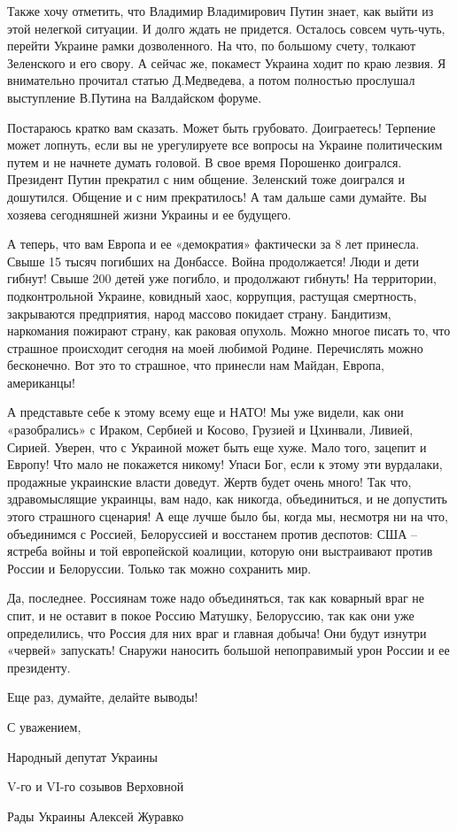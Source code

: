 Также хочу отметить, что Владимир Владимирович Путин знает, как выйти из этой
нелегкой ситуации. И долго ждать не придется. Осталось совсем чуть-чуть,
перейти Украине рамки дозволенного. На что, по большому счету, толкают
Зеленского и его свору. А сейчас же, покамест Украина ходит по краю лезвия. Я
внимательно прочитал статью Д.Медведева, а потом полностью прослушал
выступление В.Путина на Валдайском форуме.

Постараюсь кратко вам сказать. Может быть грубовато. Доиграетесь! Терпение
может лопнуть, если вы не урегулируете все вопросы на Украине политическим
путем и не начнете думать головой. В свое время Порошенко доигрался. Президент
Путин прекратил с ним общение. Зеленский тоже доигрался и дошутился. Общение и
с ним прекратилось! А там дальше сами думайте. Вы хозяева сегодняшней жизни
Украины и ее будущего.

А теперь, что вам Европа и ее «демократия» фактически за 8 лет принесла. Свыше
15 тысяч погибших на Донбассе. Война продолжается! Люди и дети гибнут! Свыше
200 детей уже погибло, и продолжают гибнуть! На территории, подконтрольной
Украине, ковидный хаос, коррупция, растущая смертность, закрываются
предприятия, народ массово покидает страну. Бандитизм, наркомания пожирают
страну, как раковая опухоль. Можно многое писать то, что страшное происходит
сегодня на моей любимой Родине. Перечислять можно бесконечно. Вот это то
страшное, что принесли нам Майдан, Европа, американцы!

А представьте себе к этому всему еще и НАТО! Мы уже видели, как они
«разобрались» с Ираком, Сербией и Косово, Грузией и Цхинвали, Ливией, Сирией.
Уверен, что с Украиной может быть еще хуже. Мало того, зацепит и Европу! Что
мало не покажется никому! Упаси Бог, если к этому эти вурдалаки, продажные
украинские власти доведут. Жертв будет очень много! Так что, здравомыслящие
украинцы, вам надо, как никогда, объединиться, и не допустить этого страшного
сценария! А еще лучше было бы, когда мы, несмотря ни на что, объединимся с
Россией, Белоруссией и восстанем против деспотов: США – ястреба войны и той
европейской коалиции, которую они выстраивают против России и Белоруссии.
Только так можно сохранить мир.

Да, последнее. Россиянам тоже надо объединяться, так как коварный враг не спит,
и не оставит в покое Россию Матушку, Белоруссию, так как они уже определились,
что Россия для них враг и главная добыча! Они будут изнутри «червей» запускать!
Снаружи наносить большой непоправимый урон России и ее президенту.

Еще раз, думайте, делайте выводы!

С уважением,    

Народный депутат Украины

V-го и VI-го созывов Верховной

Рады Украины Алексей Журавко
